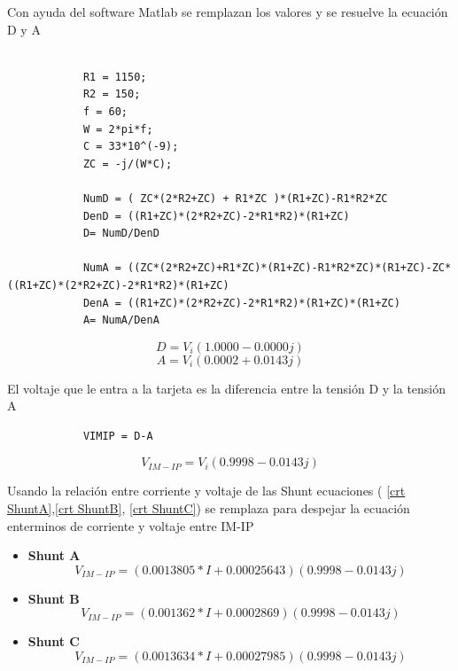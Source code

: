         Con ayuda del software Matlab se remplazan los valores y se resuelve la ecuación D y A

        \begin{lstlisting}
            
            R1 = 1150;
            R2 = 150;
            f = 60;
            W = 2*pi*f;
            C = 33*10^(-9);
            ZC = -j/(W*C);

            NumD = ( ZC*(2*R2+ZC) + R1*ZC )*(R1+ZC)-R1*R2*ZC
            DenD = ((R1+ZC)*(2*R2+ZC)-2*R1*R2)*(R1+ZC)
            D= NumD/DenD

            NumA = ((ZC*(2*R2+ZC)+R1*ZC)*(R1+ZC)-R1*R2*ZC)*(R1+ZC)-ZC*((R1+ZC)*(2*R2+ZC)-2*R1*R2)*(R1+ZC)
            DenA = ((R1+ZC)*(2*R2+ZC)-2*R1*R2)*(R1+ZC)*(R1+ZC)
            A= NumA/DenA
        \end{lstlisting}
    
        \begin{equation}\label{Tension D}
            D = V_{ i }( 1.0000 - 0.0000j)
        \end{equation}
        \begin{equation}\label{Tension A}
            A = V_{ i }( 0.0002 + 0.0143j)
        \end{equation}
        
        El voltaje que le entra a la tarjeta es la diferencia entre la tensión D y la tensión A

        \begin{lstlisting}
            VIMIP = D-A
        \end{lstlisting}

        \begin{equation}\label{Tension V IM-IP}
            V_{IM-IP} = V_{ i }( 0.9998 - 0.0143j)
        \end{equation}

        
        Usando la relación entre corriente y voltaje de las Shunt ecuaciones ( \ref{crt ShuntA},\ref{crt ShuntB}, \ref{crt ShuntC}) se remplaza para despejar la ecuación enterminos de corriente y voltaje entre IM-IP
        \begin{itemize}
            \item \textbf{Shunt A} 
                \begin{equation}\label{Tension V IM-IP}
                    V_{IM-IP} = (0.0013805*I + 0.00025643)( 0.9998 - 0.0143j)
                \end{equation}
            \item \textbf{Shunt B} 
                \begin{equation}\label{Tension V IM-IP}
                    V_{IM-IP} = (0.001362*I + 0.0002869)( 0.9998 - 0.0143j)
                \end{equation}
            \item \textbf{Shunt C} 
                \begin{equation}\label{Tension V IM-IP}
                    V_{IM-IP} = (0.0013634*I + 0.00027985)( 0.9998 - 0.0143j)
                \end{equation}
        \end{itemize}

